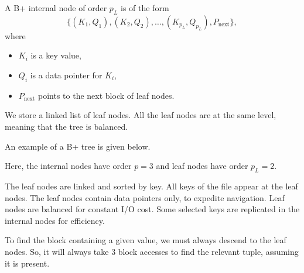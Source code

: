 \documentclass[a4paper, openany]{memoir}
\newcommand{\bplusinternalnodesng}[3]{
    \draw (0+#1, 0+#2) -- (5*0.75+#1, 0+#2)
    -- (5*0.75+#1, 0.5+#2) 
    -- (0+#1, 0.5+#2)
    -- cycle;
    \foreach \i in {1, 2, 3, 4} {
        \draw (\i*0.75+#1, 0+#2) -- (\i*0.75+#1, 0.5+#2);
    }
    \foreach \i in {0, 2} {
        \draw[fill=black] (\i*0.75+0.75/2+#1, 0.25+#2) circle (2pt);
    }
    \foreach \x[count=\i] in {#3} {
        \node at (\i*0.75*2-0.75+0.75/2+#1, 0.25+#2) {\texttt{\x}};
    }
}
\newcommand{\bplusinternalnodedbl}[3]{
    \draw (0+#1, 0+#2) -- (5*0.75+#1, 0+#2)
    -- (5*0.75+#1, 0.5+#2) 
    -- (0+#1, 0.5+#2)
    -- cycle;
    \foreach \i in {1, 2, 3, 4} {
        \draw (\i*0.75+#1, 0+#2) -- (\i*0.75+#1, 0.5+#2);
    }
    \foreach \i in {0, 2, 4} {
        \draw[fill=black] (\i*0.75+0.75/2+#1, 0.25+#2) circle (2pt);
    }
    \foreach \x[count=\i] in {#3} {
        \node at (\i*0.75*2-0.75+0.75/2+#1, 0.25+#2) {\texttt{\x}};
    }
}
\newcommand{\bplusleafnodedbl}[3]{
    \draw (0+#1, 0+#2) -- (2+#1, 0+#2)
    -- (2+#1, 0.5+#2)
    -- (0+#1, 0.5+#2)
    -- cycle;

    \draw (1+#1, 0+#2) -- (1+#1, 0.5+#2);

    \foreach \x[count=\i] in {#3} {
        \filldraw[red] (\i-0.25+#1, 0.25+#2) circle (2pt);
        \node at (\i-0.75+#1, 0.25+#2) {\texttt{\x}};
    }
}
\newcommand{\bplusleafnodesng}[3]{
    \draw (0+#1, 0+#2) -- (1+#1, 0+#2)
    -- (1+#1, 0.5+#2)
    -- (0+#1, 0.5+#2)
    -- cycle;

    \filldraw[red] (0.75+#1, 0.25+#2) circle (2pt);
    \node at (0.25+#1, 0.25+#2) {\texttt{#3}};
}
\begin{document}
A B+ internal node of order $p_L$ is of the form
\[\{(K_1, Q_1), (K_2, Q_2), \dots, (K_{p_L}, Q_{p_L}), P_{\text{next}}\},\]
where
\begin{itemize}
    \item $K_i$ is a key value,
    \item $Q_i$ is a data pointer for $K_i$,
    \item $P_{\text{next}}$ points to the next block of leaf nodes.
\end{itemize}
We store a linked list of leaf nodes. All the leaf nodes are at the same level, meaning that the tree is balanced. 

An example of a B+ tree is given below.
\begin{figure}[H]
    \centering
\end{figure}
\noindent Here, the internal nodes have order $p = 3$ and leaf nodes have order $p_L = 2$. 

The leaf nodes are linked and sorted by key. All keys of the file appear at the leaf nodes. The leaf nodes contain data pointers only, to expedite navigation. Leaf nodes are balanced for constant I/O cost. Some selected keys are replicated in the internal nodes for efficiency.

To find the block containing a given value, we must always descend to the leaf nodes. So, it will always take 3 block accesses to find the relevant tuple, assuming it is present.
\end{document}
